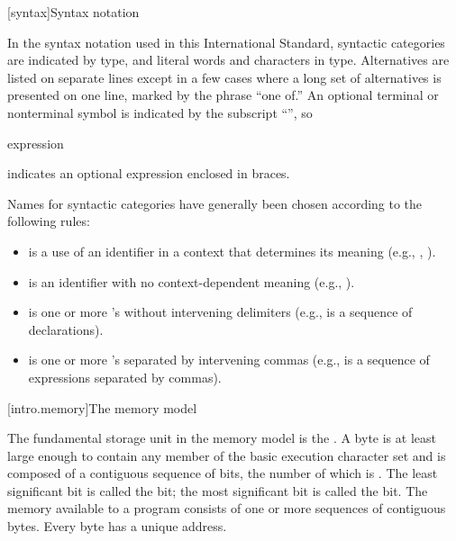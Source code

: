 [syntax]{Syntax notation}

\pnum
{}%
In the syntax notation used in this International Standard, syntactic
categories are indicated by  type, and literal words
and characters in  type. Alternatives are
listed on separate lines except in a few cases where a long set of
alternatives is presented on one line, marked by the phrase ``one of.''
An optional terminal or nonterminal symbol is indicated by the subscript
``\opt'', so

\begin{ncbnf}
\terminal{\{} expression\opt \terminal{\}}
\end{ncbnf}

indicates an optional expression enclosed in braces.%

\pnum
Names for syntactic categories have generally been chosen according to
the following rules:
\begin{itemize}
\item {} is a use of an identifier in a context that
determines its meaning (e.g., ,
).
\item {} is an identifier with no context-dependent meaning
(e.g., ).
\item {} is one or more 's without intervening
delimiters (e.g.,  is a sequence of
declarations).
\item {} is one or more 's separated by
intervening commas (e.g.,  is a sequence of
expressions separated by commas).
\end{itemize}%

[intro.memory]{The \Cpp memory model}

\pnum
{}%
The fundamental storage unit in the \Cpp memory model is the
.
A byte is at least large enough to contain any member of the basic
%
execution character set and is composed of a contiguous sequence of
bits, the number of which is . The least
significant bit is called the  bit; the most
significant bit is called the  bit. The memory
available to a \Cpp program consists of one or more sequences of
contiguous bytes. Every byte has a unique address.

